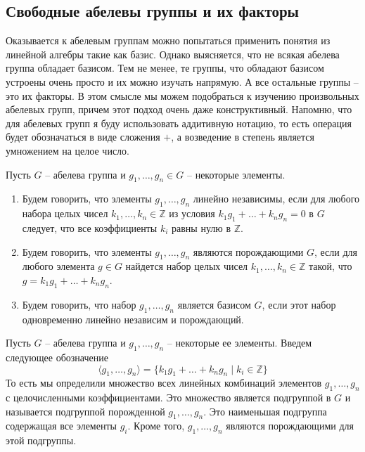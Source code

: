 \subsection{Свободные абелевы группы и их факторы}

Оказывается к абелевым группам можно попытаться применить понятия из линейной алгебры такие как базис.
Однако выясняется, что не всякая абелева группа обладает базисом.
Тем не менее, те группы, что обладают базисом устроены очень просто и их можно изучать напрямую.
А все остальные группы -- это их факторы.
В этом смысле мы можем подобраться к изучению произвольных абелевых групп, причем этот подход очень даже конструктивный.
Напомню, что для абелевых групп я буду использовать аддитивную нотацию, то есть операция будет обозначаться в виде сложения $+$, а возведение в степень является умножением на целое число.

\begin{definition}
Пусть $G$ -- абелева группа и $g_1,\ldots, g_n\in G$ -- некоторые элементы.
\begin{enumerate}
\item Будем говорить, что элементы $g_1,\ldots, g_n$ линейно независимы, если для любого набора целых чисел $k_1,\ldots,k_n\in\mathbb Z$ из условия $k_1 g_1+ \ldots + k_n g_n = 0$ в $G$ следует, что все коэффициенты $k_i$ равны нулю в $\mathbb Z$.

\item Будем говорить, что элементы $g_1,\ldots, g_n$ являются порождающими $G$, если для любого элемента $g\in G$ найдется набор целых чисел $k_1,\ldots, k_n\in \mathbb Z$ такой, что $g = k_1 g_1 +\ldots + k_n g_n$.

\item Будем говорить, что набор $g_1,\ldots, g_n$ является базисом $G$, если этот набор одновременно линейно независим и порождающий.
\end{enumerate}
\end{definition}


\begin{definition}
Пусть $G$ -- абелева группа и $g_1,\ldots, g_n$ -- некоторые ее элементы.
Введем следующее обозначение
\[
\langle g_1,\ldots, g_n \rangle = \{ k_1 g_1 + \ldots + k_n g_n \mid k_i \in \mathbb Z \}
\]
То есть мы определили множество всех линейных комбинаций элементов $g_1,\ldots, g_n$ с целочисленными коэффициентами.
Это множество является подгруппой в $G$ и называется подгруппой порожденной $g_1,\ldots, g_n$.
Это наименьшая подгруппа содержащая все элементы $g_i$.
Кроме того, $g_1,\ldots, g_n$ являются порождающими для этой подгруппы.
\end{definition}

